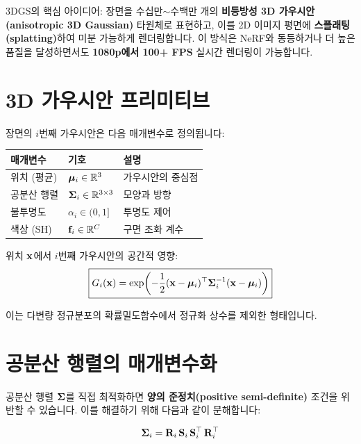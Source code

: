 \documentclass[11pt, a4paper]{report}
\begin{document}
\begin{keyidea}
3DGS의 핵심 아이디어: 장면을 수십만$\sim$수백만 개의 \textbf{비등방성 3D 가우시안(anisotropic 3D Gaussian)} 타원체로 표현하고, 이를 2D 이미지 평면에 \textbf{스플래팅(splatting)}하여 미분 가능하게 렌더링합니다. 이 방식은 NeRF와 동등하거나 더 높은 품질을 달성하면서도 \textbf{1080p에서 100+ FPS} 실시간 렌더링이 가능합니다.
\end{keyidea}


\section{3D 가우시안 프리미티브}
\label{sec:gaussian_primitive}

장면의 $i$번째 가우시안은 다음 매개변수로 정의됩니다:

\begin{center}
\renewcommand{\arraystretch}{1.3}
\begin{tabular}{lll}
\toprule
\textbf{매개변수} & \textbf{기호} & \textbf{설명} \\
\midrule
위치 (평균) & $\bm{\mu}_i \in \mathbb{R}^3$ & 가우시안의 중심점 \\
공분산 행렬 & $\bm{\Sigma}_i \in \mathbb{R}^{3\times 3}$ & 모양과 방향 \\
불투명도 & $\alpha_i \in (0, 1]$ & 투명도 제어 \\
색상 (SH) & $\mathbf{f}_i \in \mathbb{R}^C$ & 구면 조화 계수 \\
\bottomrule
\end{tabular}
\end{center}

위치 $\mathbf{x}$에서 $i$번째 가우시안의 공간적 영향:
\begin{equation}
\boxed{
G_i(\mathbf{x}) = \exp\!\left( -\frac{1}{2} (\mathbf{x} - \bm{\mu}_i)^\top \bm{\Sigma}_i^{-1} (\mathbf{x} - \bm{\mu}_i) \right)
}
\label{eq:3d_gaussian}
\end{equation}

이는 다변량 정규분포의 확률밀도함수에서 정규화 상수를 제외한 형태입니다.


\section{공분산 행렬의 매개변수화}

공분산 행렬 $\bm{\Sigma}$를 직접 최적화하면 \textbf{양의 준정치(positive semi-definite)} 조건을 위반할 수 있습니다. 이를 해결하기 위해 다음과 같이 분해합니다:

\begin{equation}
\bm{\Sigma}_i = \mathbf{R}_i \, \mathbf{S}_i \, \mathbf{S}_i^\top \, \mathbf{R}_i^\top
\label{eq:cov_decomp}
\end{equation}
\end{document}

